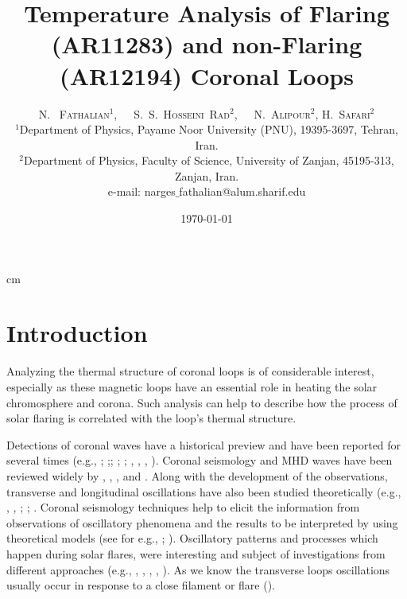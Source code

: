 \documentclass[oneside,onecolumn]{article}
\title{Temperature Analysis of Flaring (AR11283) and non-Flaring (AR12194) Coronal Loops}
\author{\textsc{N.~ Fathalian$^1$,~~~S.~S.~Hosseini~Rad$^2$,~~~N.~Alipour$^2$, H.~Safari$^2$}
\\$^1$Department of Physics, Payame Noor University (PNU), 19395-3697, Tehran, Iran.
\\$^2$Department of Physics, Faculty of Science, University of Zanjan, 45195-313, Zanjan, Iran.
\\e-mail: narges$\_$fathalian@alum.sharif.edu
}
\date{\today} %
\begin{document}
\maketitle




 cm

\section{Introduction}\label{sect:intro}

Analyzing the thermal structure of coronal loops is of considerable interest, especially as these magnetic loops have an essential role in heating the solar chromosphere and corona. Such analysis can help to describe how the process of solar flaring is correlated with the loop's thermal structure. 

Detections of coronal waves have a historical preview and have been reported for several times (e.g., \citet{ref:Aschwanden1999}; \citet{ref:Nakariakov1999};\citet{ref:Wang2003}; \citet{ref:Wang2004}; \citet{ref:Berghmans1999}; \citet{ref:DeMoortel2000}, \citet{ref:Verwichte2004}, \citet{ref:DeMoortel2007}, \citet{ref:Ballai2011}). Coronal seismology and MHD waves have been reviewed widely by \citet{ref:DeMoortel2005}, \citet{ref:Nakariakov2005}, \citet{ref:Aschwanden2006}, \citet{ref:Banerjee2007} and \citet{ref:DeMoortel2012}. Along with the development of the observations, transverse and longitudinal oscillations have also been studied theoretically (e.g., \citet{ref:Gruszecki2006}, \citet{ref:Pascoe2007}, \citet{ref:Fathalian2009}; \citet{ref:Luna2010};  \citet{ref:Fathalian2010}. Coronal seismology techniques help to elicit the information from observations of oscillatory phenomena and the results to be interpreted by using theoretical models (see for e.g., \citet{ref:Roberts1984}; \citet{ref:Goossens1992}). Oscillatory patterns and processes which happen during solar flares, were interesting and subject of investigations from different approaches (e.g., \citet{ref:Nakariakov2010}, \citet{ref:Nistico2013}, \citet{ref:Anfinogentov2013}, \citet{ref:Hindman2014}, \citet{ref:Russell2015}). As we know the transverse loops oscillations usually occur in response to a close filament or flare (\citet{ref:Wills-Davey1999}). 
\end{document}
